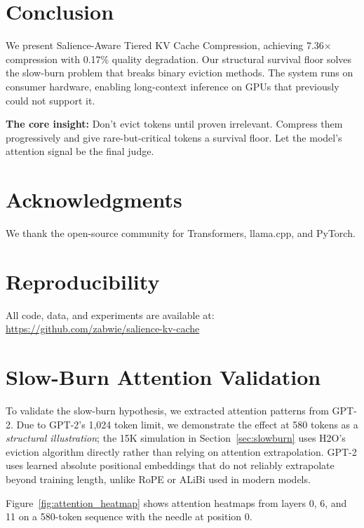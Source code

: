 \documentclass[11pt]{article}
\begin{document}
\section{Conclusion}

We present Salience-Aware Tiered KV Cache Compression, achieving 7.36$\times$ compression with 0.17\% quality degradation. Our structural survival floor solves the slow-burn problem that breaks binary eviction methods. The system runs on consumer hardware, enabling long-context inference on GPUs that previously could not support it.

\textbf{The core insight:} Don't evict tokens until proven irrelevant. Compress them progressively and give rare-but-critical tokens a survival floor. Let the model's attention signal be the final judge.

\section*{Acknowledgments}

We thank the open-source community for Transformers, llama.cpp, and PyTorch.

\section*{Reproducibility}

All code, data, and experiments are available at: \url{https://github.com/zabwie/salience-kv-cache}

\appendix

\section{Slow-Burn Attention Validation}

To validate the slow-burn hypothesis, we extracted attention patterns from GPT-2. Due to GPT-2's 1,024 token limit, we demonstrate the effect at 580 tokens as a \textit{structural illustration}; the 15K simulation in Section~\ref{sec:slowburn} uses H2O's eviction algorithm directly rather than relying on attention extrapolation. GPT-2 uses learned absolute positional embeddings that do not reliably extrapolate beyond training length, unlike RoPE or ALiBi used in modern models.

Figure~\ref{fig:attention_heatmap} shows attention heatmaps from layers 0, 6, and 11 on a 580-token sequence with the needle at position 0.
\end{document}
